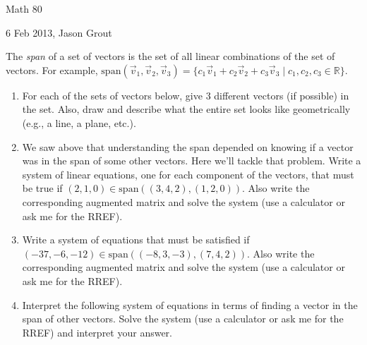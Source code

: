 \documentclass[11pt]{article}
\begin{document}
\newcommand{\vecspan}[1]{\mathrm{span}(#1)}
\begin{center}{\centerline\Large Math 80}

{\centering\large 6 Feb 2013, Jason Grout}
\end{center}

The \emph{span} of a set of vectors is the set of all linear combinations of the set of vectors.  For example, $\vecspan{\vec v_1,\vec v_2,\vec v_3}=\{c_1\vec v_1+c_2\vec v_2+c_3\vec v_3 \mid c_1,c_2,c_3\in\mathbb{R}\}$.

\begin{enumerate}
\item For each of the sets of vectors below, give 3 different vectors (if possible) in the set.  Also, draw and describe what the entire set looks like geometrically (e.g., a line, a plane, etc.).
\begin{enumerate}
\end{enumerate}

\item We saw above that understanding the span depended on knowing if a vector was in the span of some other vectors.  Here we'll tackle that problem.  Write a system of linear equations, one for each component of the vectors, that must be true if $(2,1,0)\in\vecspan{(3,4,2), (1,2,0)}$.  
Also write the corresponding augmented matrix and solve the system (use a calculator or ask me for the RREF).
\item Write a system of equations that must be satisfied if $(-37, -6, -12)\in\vecspan{(-8,3,-3), (7,4,2)}$.
Also write the corresponding augmented matrix and solve the system (use a calculator or ask me for the RREF).
\item Interpret the following system of equations in terms of finding a vector in the span of other vectors.  Solve the system (use a calculator or ask me for the RREF) and interpret your answer.


\end{enumerate}
\end{document}

